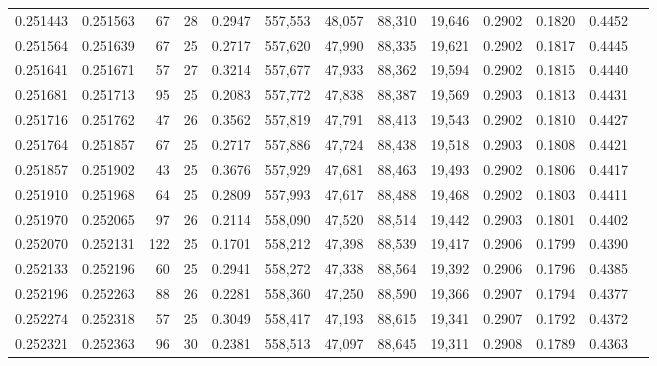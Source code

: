 \begin{tabular}{rrrrrrrrrrrrr}
0.251443 & 0.251563 &  67 &  28 &                                     0.2947 & 557,553 &  48,057 &  88,310 &  19,646 & 0.2902 & 0.1820 & 0.4452 \\
0.251564 & 0.251639 &  67 &  25 &                                     0.2717 & 557,620 &  47,990 &  88,335 &  19,621 & 0.2902 & 0.1817 & 0.4445 \\
0.251641 & 0.251671 &  57 &  27 &                                     0.3214 & 557,677 &  47,933 &  88,362 &  19,594 & 0.2902 & 0.1815 & 0.4440 \\
0.251681 & 0.251713 &  95 &  25 &                                     0.2083 & 557,772 &  47,838 &  88,387 &  19,569 & 0.2903 & 0.1813 & 0.4431 \\
0.251716 & 0.251762 &  47 &  26 &                                     0.3562 & 557,819 &  47,791 &  88,413 &  19,543 & 0.2902 & 0.1810 & 0.4427 \\
0.251764 & 0.251857 &  67 &  25 &                                     0.2717 & 557,886 &  47,724 &  88,438 &  19,518 & 0.2903 & 0.1808 & 0.4421 \\
0.251857 & 0.251902 &  43 &  25 &                                     0.3676 & 557,929 &  47,681 &  88,463 &  19,493 & 0.2902 & 0.1806 & 0.4417 \\
0.251910 & 0.251968 &  64 &  25 &                                     0.2809 & 557,993 &  47,617 &  88,488 &  19,468 & 0.2902 & 0.1803 & 0.4411 \\
0.251970 & 0.252065 &  97 &  26 &                                     0.2114 & 558,090 &  47,520 &  88,514 &  19,442 & 0.2903 & 0.1801 & 0.4402 \\
0.252070 & 0.252131 & 122 &  25 &                                     0.1701 & 558,212 &  47,398 &  88,539 &  19,417 & 0.2906 & 0.1799 & 0.4390 \\
0.252133 & 0.252196 &  60 &  25 &                                     0.2941 & 558,272 &  47,338 &  88,564 &  19,392 & 0.2906 & 0.1796 & 0.4385 \\
0.252196 & 0.252263 &  88 &  26 &                                     0.2281 & 558,360 &  47,250 &  88,590 &  19,366 & 0.2907 & 0.1794 & 0.4377 \\
0.252274 & 0.252318 &  57 &  25 &                                     0.3049 & 558,417 &  47,193 &  88,615 &  19,341 & 0.2907 & 0.1792 & 0.4372 \\
0.252321 & 0.252363 &  96 &  30 &                                     0.2381 & 558,513 &  47,097 &  88,645 &  19,311 & 0.2908 & 0.1789 & 0.4363 \\

\end{tabular}
